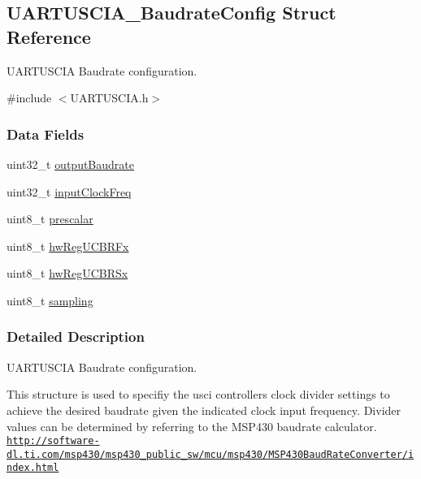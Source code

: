 \subsection{U\+A\+R\+T\+U\+S\+C\+I\+A\+\_\+\+Baudrate\+Config Struct Reference}
\label{struct_u_a_r_t_u_s_c_i_a___baudrate_config}


U\+A\+R\+T\+U\+S\+C\+I\+A Baudrate configuration.  




{\ttfamily \#include $<$U\+A\+R\+T\+U\+S\+C\+I\+A.\+h$>$}

\subsubsection*{Data Fields}
\begin{DoxyCompactItemize}
\item 
uint32\+\_\+t \hyperlink{struct_u_a_r_t_u_s_c_i_a___baudrate_config_acd162ef89249236d66c6888fcccd36cc}{output\+Baudrate}
\item 
uint32\+\_\+t \hyperlink{struct_u_a_r_t_u_s_c_i_a___baudrate_config_ab26172da351b915ec47148df5f601573}{input\+Clock\+Freq}
\item 
uint8\+\_\+t \hyperlink{struct_u_a_r_t_u_s_c_i_a___baudrate_config_a6edfa7183e52dd91e3fa62ad5a186d02}{prescalar}
\item 
uint8\+\_\+t \hyperlink{struct_u_a_r_t_u_s_c_i_a___baudrate_config_ad0e8c8dfaee0456a272bcaf7625b5998}{hw\+Reg\+U\+C\+B\+R\+Fx}
\item 
uint8\+\_\+t \hyperlink{struct_u_a_r_t_u_s_c_i_a___baudrate_config_a638b5df1c71e9495f489a1e4ea5aa2c4}{hw\+Reg\+U\+C\+B\+R\+Sx}
\item 
uint8\+\_\+t \hyperlink{struct_u_a_r_t_u_s_c_i_a___baudrate_config_a6c78a1a4babef0a3723616d2ae4e7b9e}{sampling}
\end{DoxyCompactItemize}


\subsubsection{Detailed Description}
U\+A\+R\+T\+U\+S\+C\+I\+A Baudrate configuration. 

This structure is used to specifiy the usci controller\textquotesingle{}s clock divider settings to achieve the desired baudrate given the indicated clock input frequency. Divider values can be determined by referring to the M\+S\+P430 baudrate calculator. \href{http://software-dl.ti.com/msp430/msp430_public_sw/mcu/msp430/MSP430BaudRateConverter/index.html}{\tt http\+://software-\/dl.\+ti.\+com/msp430/msp430\+\_\+public\+\_\+sw/mcu/msp430/\+M\+S\+P430\+Baud\+Rate\+Converter/index.\+html}

